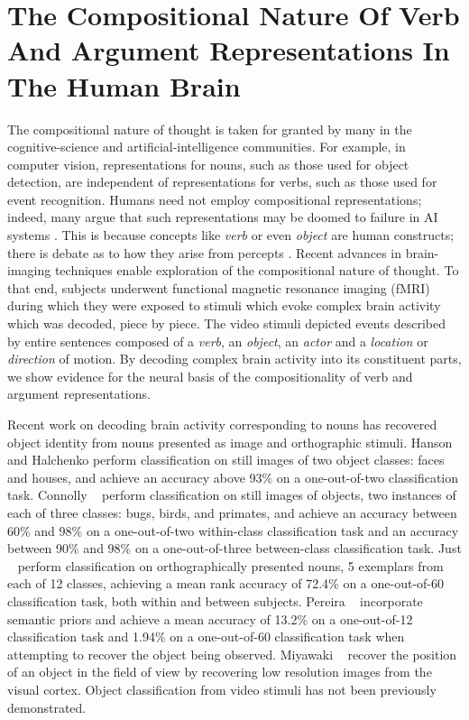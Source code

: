 \chapter{The Compositional Nature Of Verb And Argument Representations In The Human Brain}
\label{chapter:nips2013d}

The compositional nature of thought is taken for granted by many in the
cognitive-science and artificial-intelligence communities.
%
For example, in computer vision, representations for nouns, such as those
used for object detection, are independent of representations for verbs, such
as those used for event recognition.
%
Humans need not employ compositional representations; indeed, many argue that
such representations may be doomed to failure in AI systems
\citep{brooks1991intelligence}.
%
This is because concepts like \emph{verb} or even \emph{object} are human
constructs; there is debate as to how they arise from percepts
\citep{smith1996origin}.
%
Recent advances in brain-imaging techniques enable exploration of the
compositional nature of thought.
%
To that end, subjects underwent functional magnetic resonance imaging (fMRI)
during which they were exposed to stimuli which evoke complex brain activity
which was decoded, piece by piece.
%
The video stimuli depicted events described by entire sentences composed of a
\emph{verb}, an \emph{object}, an \emph{actor} and a \emph{location} or
\emph{direction} of motion.
%
By decoding complex brain activity into its constituent parts, we show evidence
for the neural basis of the compositionality of verb and argument
representations.

Recent work on decoding brain activity corresponding to nouns has
recovered object identity from nouns presented as image and orthographic
stimuli.
%
Hanson and Halchenko \cite{hanson2009} perform classification on still
images of two object classes: faces and houses, and achieve an
accuracy above 93\% on a one-out-of-two classification task.
%
Connolly \etal\ \cite{connolly2012} perform classification on still
images of objects, two instances of each of three classes: bugs,
birds, and primates, and achieve an accuracy between 60\% and 98\% on
a one-out-of-two within-class classification task and an accuracy
between 90\% and 98\% on a one-out-of-three between-class
classification task.
%
Just \etal\ \cite{just2010} perform classification on orthographically presented nouns, 5
exemplars from each of 12 classes, achieving a mean rank accuracy of 72.4\% on
a one-out-of-60 classification task, both within and between subjects.
%
Pereira \etal\ \cite{pereira2012} incorporate semantic priors and achieve a mean accuracy
of 13.2\% on a one-out-of-12 classification task and 1.94\% on a one-out-of-60
classification task when attempting to recover the object being observed.
%
Miyawaki \etal\ \cite{miyawaki2008} recover the position of an object in the field of view by
recovering low resolution images from the visual cortex.
%
Object classification from video stimuli has not been previously demonstrated.

